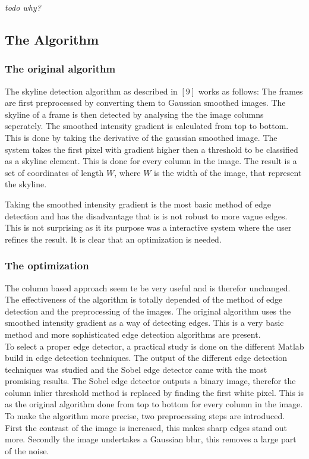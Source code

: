 \documentclass[10pt]{article}
\begin{document}

\textit{todo why?}
 \subsection{The Algorithm}
 \subsubsection{The original algorithm}
The skyline detection algorithm as described in $[9]$ works as follows:
The frames are first preprocessed by converting them to Gaussian smoothed images.
The skyline of a frame is then detected by analysing the the image columns
seperately.
The smoothed intensity gradient is calculated from top to bottom. This is done
by taking the derivative of the gaussian smoothed image.
The system takes the first pixel with gradient higher then a threshold to be
classified as a skyline element.  This is done for every column in the image.
The result is a set of coordinates of length $W$,
where $W$ is the width of the image, that represent the skyline.

Taking the smoothed intensity gradient is the most basic method of edge
detection and has the disadvantage that is is not robust to more vague
edges. This is not surprising as it its purpose was a interactive system where the
user refines the result. It is clear that an optimization is needed.

  \subsubsection{The optimization}
The column based approach seem te be very useful and is therefor unchanged. 
The effectiveness of the algorithm is totally depended of the method of edge
detection and the preprocessing of the images. 
The original algorithm uses the smoothed intensity gradient as a way of
detecting edges. This is a very basic method and more sophisticated edge
detection algorithms are present.\\
To select a proper edge detector, a practical study is done on the different
Matlab build in edge detection techniques. The output of the different edge
detection techniques was studied and the Sobel edge detector came with the most
promising results. The Sobel edge detector outputs a binary image, therefor the column inlier
threshold method is replaced by finding the first white pixel. This is as the
original algorithm done from top to bottom for every column in the image.
\\ 
To make the algorithm more precise, two preprocessing
steps are introduced. First the contrast of the image is increased, this makes
sharp edges stand out more.  Secondly the image undertakes a Gaussian blur,
this removes a large part of the noise.
\end{document}
